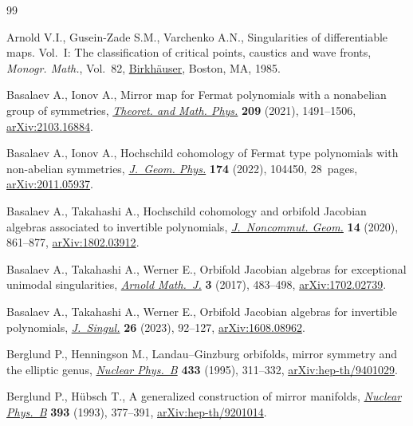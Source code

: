 \begin{thebibliography}{99}
\footnotesize\itemsep=0pt

Arnold V.I., Gusein-Zade S.M., Varchenko A.N., Singularities of differentiable
 maps. {V}ol.~{I}: The classification of critical points, caustics and wave
 fronts, \textit{Monogr. Math.}, Vol.~82, \href{https://doi.org/10.1007/978-1-4612-5154-5}{Birkh\"auser}, Boston, MA, 1985.

Basalaev A., Ionov A., Mirror map for {F}ermat polynomials with a nonabelian
 group of symmetries, \href{https://doi.org/10.1134/S0040577921110015}{\textit{Theoret. and Math. Phys.}} \textbf{209} (2021),
 1491--1506, \href{https://arxiv.org/abs/2103.16884}{arXiv:2103.16884}.

Basalaev A., Ionov A., Hochschild cohomology of {F}ermat type polynomials with
 non-abelian symmetries, \href{https://doi.org/10.1016/j.geomphys.2021.104450}{\textit{J.~Geom. Phys.}} \textbf{174} (2022), 104450,
 28~pages, \href{https://arxiv.org/abs/2011.05937}{arXiv:2011.05937}.

Basalaev A., Takahashi A., Hochschild cohomology and orbifold {J}acobian
 algebras associated to invertible polynomials, \href{https://doi.org/10.4171/jncg/370}{\textit{J.~Noncommut. Geom.}}
 \textbf{14} (2020), 861--877, \href{https://arxiv.org/abs/1802.03912}{arXiv:1802.03912}.

Basalaev A., Takahashi A., Werner E., Orbifold {J}acobian algebras for
 exceptional unimodal singularities, \href{https://doi.org/10.1007/s40598-017-0076-8}{\textit{Arnold Math.~J.}} \textbf{3}
 (2017), 483--498, \href{https://arxiv.org/abs/1702.02739}{arXiv:1702.02739}.

Basalaev A., Takahashi A., Werner E., Orbifold {J}acobian algebras for
 invertible polynomials, \href{https://doi.org/10.5427/jsing.2023.26f}{\textit{J.~Singul.}} \textbf{26} (2023), 92--127,
 \href{https://arxiv.org/abs/1608.08962}{arXiv:1608.08962}.

Berglund P., Henningson M., Landau--{G}inzburg orbifolds, mirror symmetry and
 the elliptic genus, \href{https://doi.org/10.1016/0550-3213(94)00389-V}{\textit{Nuclear Phys.~B}} \textbf{433} (1995), 311--332,
 \href{https://arxiv.org/abs/hep-th/9401029}{arXiv:hep-th/9401029}.

Berglund P., H\"ubsch T., A generalized construction of mirror manifolds,
 \href{https://doi.org/10.1016/0550-3213(93)90250-S}{\textit{Nuclear Phys.~B}} \textbf{393} (1993), 377--391,
 \href{https://arxiv.org/abs/hep-th/9201014}{arXiv:hep-th/9201014}.


\end{thebibliography}
